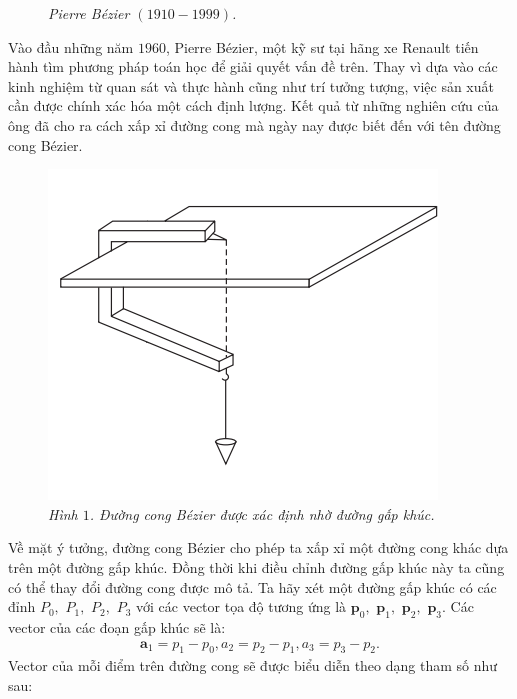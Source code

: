 \begin{multicols}{2}
\begin{figure}[H]
		\caption{\small\textit{\color{toanhocdoisong}Pierre Bézier $(1910 - 1999)$.}}
		\vspace*{-10pt}
	\end{figure}	
	Vào đầu những năm $1960$, Pierre Bézier, một kỹ sư tại hãng xe Renault tiến hành tìm phương pháp toán học để giải quyết vấn đề trên. Thay vì dựa vào các kinh nghiệm từ quan sát và thực hành cũng như trí tưởng tượng, việc sản xuất cần được chính xác hóa một cách định lượng. Kết quả từ những nghiên cứu của ông đã cho ra cách xấp xỉ đường cong mà ngày nay được biết đến với tên đường cong Bézier.
	\begin{figure}[H]
		\vspace*{-5pt}
		\centering
		\captionsetup{labelformat= empty, justification=centering}
		\includegraphics[width= 0.85\linewidth]{2}
		\caption{\small\textit{\color{toanhocdoisong}Hình $1$. Đường cong Bézier được xác định nhờ đường gấp khúc.}}
		\vspace*{-10pt}
	\end{figure}
	Về mặt ý tưởng, đường cong Bézier cho phép ta xấp xỉ một đường cong khác dựa trên một đường gấp khúc. Đồng thời khi điều chỉnh đường gấp khúc này ta cũng có thể thay đổi đường cong được mô tả.
	\vskip 0.1cm
	Ta hãy xét một đường gấp khúc có các đỉnh $P_0,$ $P_1,$ $P_2,$ $P_3$ với các vector tọa độ tương ứng là $\pmb p_0,$ $\pmb p_1,$ $\pmb p_2,$ $\pmb p_3$. Các vector của các đoạn gấp khúc sẽ là:
	\begin{align*}
		\pmb a_1=p_1-p_0,a_2=p_2-p_1,a_3=p_3-p_2.
	\end{align*}
	Vector của mỗi điểm trên đường cong sẽ được biểu diễn theo dạng tham số như sau:
	\begin{align*}

\end{align*}
\end{multicols}
